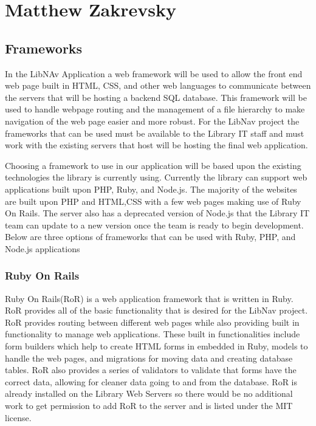 \documentclass[letterpaper,10pt,titlepage, onecolumn, compsoc]{IEEEtran}
\begin{document}
\section{Matthew Zakrevsky}

\subsection{Frameworks}
In the LibNAv Application a web framework will be used to allow the front end web page built in HTML, CSS, and other web languages to communicate between the servers that will be hosting a backend SQL database. This framework will be used to handle webpage routing and the management of a file hierarchy to make navigation of the web page easier and more robust. For the LibNav project the frameworks that can be used must be available to the Library IT staff and must work with the existing servers that host will be hosting the final web application.
 
Choosing a framework to use in our application will be based upon the existing technologies the library is currently using. Currently the library can support web applications built upon PHP, Ruby, and Node.js. The majority of the websites are built upon PHP and HTML,CSS with a few web pages making use of Ruby On Rails. The server also has a deprecated version of Node.js that the Library IT team can update to a new version once the team is ready to begin development. Below are three options of frameworks that can be used with Ruby, PHP, and Node.js applications

\subsubsection{Ruby On Rails}
Ruby On Rails(RoR) is a web application framework that is written in Ruby. RoR provides all of the basic functionality that is desired for the LibNav project. RoR provides routing between different web pages while also providing built in functionality to manage web applications. These built in functionalities include form builders which help to create HTML forms in embedded in Ruby, models to handle the web pages, and migrations for moving data and creating database tables. RoR also provides a series of validators to validate that forms have the correct data, allowing for cleaner data going to and from the database. RoR is already installed on the Library Web Servers so there would be no additional work to get permission to add RoR to the server and is listed under the MIT license.\cite{rubyonrails}
\end{document}
